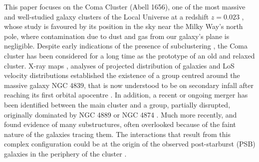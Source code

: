 \documentclass{aa}
\begin{document}
This paper focuses on the Coma Cluster (Abell 1656), one of the most massive and well-studied galaxy clusters of the Local Universe at a redshift $z = 0.023$ \citep{Kang_2025}, whose study is favoured by its position in the sky near the Milky Way's north pole, where contamination due to dust and gas from our galaxy's plane is negligible. Despite early indications of the presence of subclustering \citep[see][and references therein]{Biviano98}, the Coma cluster has been considered for a long time as the prototype of an old and relaxed cluster. X-ray maps \citep{White_1993, Neumann_2001}, analyses of projected distribution of galaxies \citep{Baier_1990} and LoS velocity distributions \citep{Colless_1996} established the existence of a group centred around the massive galaxy NGC 4839, that is now understood to be on secondary infall after reaching its first orbital apocentre \citep[\textit{e.g.}][]{Biviano+96,Lyskova+19,Churazov_2021}. In addition, a recent or ongoing merger has been identified between the main cluster and a group, partially disrupted, originally dominated by NGC 4889 or NGC 4874 \citep{Biviano+96,Adami_2005a}. Much more recently, \citet{Costa_2025} and \citet{Kang_2025} found evidence of many substructures, often overlooked because of the faint nature of the galaxies tracing them. The interactions that result from this complex configuration could be at the origin of the observed post-starburst (PSB) galaxies in the periphery of the cluster \citep{Caldwell_1993, Gavazzi_2010}. 
\end{document}
